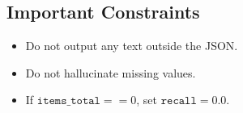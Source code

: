 \begin{tcolorbox}
\subsection*{Important Constraints}

\begin{itemize}
    \item Do not output any text outside the JSON.
    \item Do not hallucinate missing values.
    \item If $\texttt{items\_total} == 0$, set $\texttt{recall} = 0.0$.
\end{itemize}

\end{tcolorbox}
